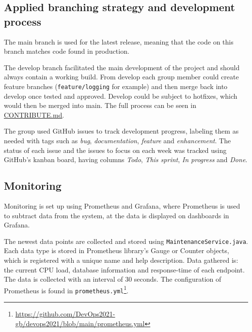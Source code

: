 \subsection{Applied branching strategy and development process} 
The main branch is used for the latest release, meaning that the code on this branch matches code found in production.

The develop branch facilitated the main development of the project and should always contain a working build. From develop each group member could create feature branches (\texttt{feature/logging} for example) and then merge back into develop once tested and approved. Develop could be subject to hotfixes, which would then be merged into main. The full process can be seen in \underline{\href{https://github.com/DevOps2021-gb/devops2021/blob/main/CONTRIBUTE.md}{CONTRIBUTE.md}}.

The group used GitHub issues to track development progress, labeling them as needed with tags such as \textit{bug}, \textit{documentation}, \textit{feature} and \textit{enhancement}. The status of each issue and the issues to focus on each week was tracked using GitHub's kanban board, having columns \textit{Todo}, \textit{This sprint}, \textit{In progress} and \textit{Done}.

\subsection{Monitoring} 
\label{subsection:monitoring}
Monitoring is set up using Prometheus and Grafana, where Prometheus is used to subtract data from the system, at the data is displayed on dashboards in Grafana.

The newest data points are collected and stored using \texttt{MaintenanceService.java}. Each data type is stored in Prometheus library's Gauge or Counter objects, which is registered with a unique name and help description. Data gathered is: the current CPU load, database information and response-time of each endpoint. The data is collected with an interval of 30 seconds. The configuration of Prometheus is found in \texttt{prometheus.yml}\footnote{\url{https://github.com/DevOps2021-gb/devops2021/blob/main/prometheus.yml}}.

